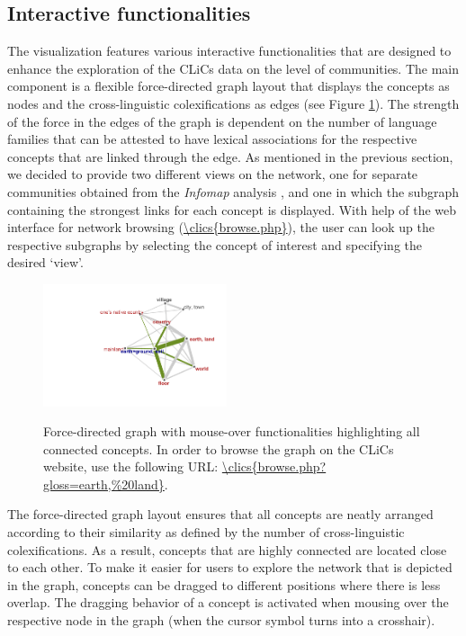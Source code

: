 \subsection{Interactive functionalities}



The visualization features various interactive functionalities that are designed to enhance the exploration of the CLiCs data on the level of communities. The main component is a flexible force-directed graph layout that displays the concepts as nodes and the cross-linguistic colexifications as edges (see Figure \ref{EarthLand}). The strength of the force in the edges of the graph is dependent on the number of language families that can be attested to have lexical associations for the respective concepts that are linked through the edge. As mentioned in the previous section, we decided to provide two different views on the network, one for separate communities obtained from the \emph{Infomap} analysis \cite{Rosvall2008}, and one in which the subgraph containing the strongest links for each concept is displayed.  With help of the web interface for network browsing (\url{\clics{browse.php}}), the user can look up the respective subgraphs by selecting the concept of interest and specifying the desired `view'.

\begin{figure}[htbp]
    \centering
    \href{\clics{browse.php?gloss=earth,\%20land}}{\includegraphics[width=0.48\textwidth,trim=5cm 2cm 1cm 1cm]{img/earthland2.pdf}}
\caption{Force-directed graph with mouse-over functionalities highlighting all connected concepts.
In order to browse the graph on the CLiCs website, use the following URL: \url{\clics{browse.php?gloss=earth,\%20land}}.}
\label{EarthLand}
\end{figure}

The force-directed graph layout ensures that all concepts are neatly arranged according to their similarity as defined by the number of cross-linguistic colexifications. As a result, concepts that are highly connected are located close to each other.  To make it easier for users to explore the network that is depicted in the graph, concepts can be dragged to different positions where there is less overlap. The dragging behavior of a concept  is activated when mousing over the respective node in the graph (when the cursor symbol turns into a crosshair).

